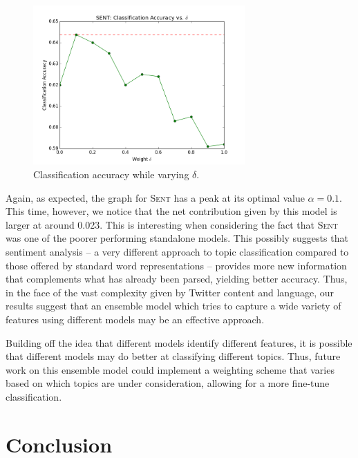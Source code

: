\documentclass[11pt]{article}
\begin{document}
\begin{figure}[h]
  \centering
    \includegraphics[width=3.2in]{ensemble_sent.png}
  \caption{Classification accuracy while varying $\delta$.}
  \label{ensemble_sent}
\end{figure}

Again, as expected, the graph for \textsc{Sent} has a peak at its optimal value $\alpha=0.1$. This time, however, we notice that the net contribution given by this model is larger at around 0.023. This is interesting when considering the fact that \textsc{Sent} was one of the poorer performing standalone models. This possibly suggests that sentiment analysis -- a very different approach to topic classification compared to those offered by standard word representations -- provides more new information that complements what has already been parsed, yielding better accuracy. Thus, in the face of the vast complexity given by Twitter content and language, our results suggest that an ensemble model which tries to capture a wide variety of features using different models may be an effective approach.

Building off the idea that different models identify different features, it is possible that different models may do better at classifying different topics. Thus, future work on this ensemble model could implement a weighting scheme that varies based on which topics are under consideration, allowing for a more fine-tune classification.

\section{Conclusion}
\end{document}
